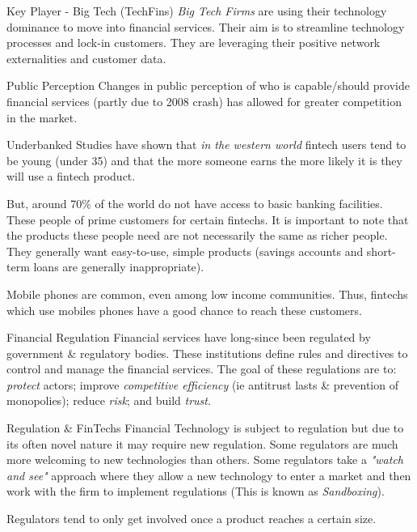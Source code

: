 \documentclass[11pt,a4paper]{article}
\begin{document}
  \begin{proposition}{Key Player - Big Tech (TechFins)}
    \textit{Big Tech Firms} are using their technology dominance to move into financial services. Their aim is to streamline technology processes and lock-in customers. They are leveraging their positive network externalities and customer data.
  \end{proposition}

  \begin{remark}{Public Perception}
    Changes in public perception of who is capable/should provide financial services (partly due to 2008 crash) has allowed for greater competition in the market.
  \end{remark}

  \begin{remark}{Underbanked}
    Studies have shown that \textit{in the western world} fintech users tend to be young (under 35) and that the more someone earns the more likely it is they will use a fintech product.
    \par But, around 70\% of the world do not have access to basic banking facilities. These people of prime customers for certain fintechs. It is important to note that the products these people need are not necessarily the same as richer people. They generally want easy-to-use, simple products (savings accounts and short-term loans are generally inappropriate).
    \par Mobile phones are common, even among low income communities. Thus, fintechs which use mobiles phones have a good chance to reach these customers.
  \end{remark}

  \begin{definition}{Financial Regulation}
    Financial services have long-since been regulated by government \& regulatory bodies. These institutions define rules and directives to control and manage the financial services. The goal of these regulations are to: \textit{protect} actors; improve \textit{competitive efficiency} (ie antitrust lasts \& prevention of monopolies); reduce \textit{risk}; and build \textit{trust}.
  \end{definition}

  \begin{remark}{Regulation \& FinTechs}
    Financial Technology is subject to regulation but due to its often novel nature it may require new regulation. Some regulators are much more welcoming to new technologies than others. Some regulators take a \textit{"watch and see"} approach where they allow a new technology to enter a market and then work with the firm to implement regulations (This is known as \textit{Sandboxing}).
    \par Regulators tend to only get involved once a product reaches a certain size.
  \end{remark}
\end{document}
